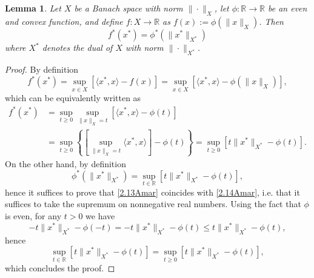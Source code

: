 \documentclass[a4paper,11pt,oneside,notitlepage]{article}
\newtheorem{lemma}[theorem]{Lemma}
\numberwithin{equation}{section}
\def\R{\mathbb{R}}
\begin{document}
\begin{lemma}
\label{lemmaApp}
    Let $X$ be a Banach space with norm $\|\cdot \|_X$, let $\phi : \R \to \R$ be an even and convex function, and define $f : X \to \R$ as $f(x) := \phi(\|x\|_X)$. Then
    \begin{equation*}
        f^*(x^*) = \phi^*(\|x^*\|_{X^*})
    \end{equation*}
    where $X^*$ denotes the dual of $X$ with norm $\|\cdot\|_{X^*}$.
\end{lemma}
\begin{proof}
    By definition
    \begin{equation*}
        f^*(x^*) = \sup_{x \in X} [\langle x^*, x \rangle - f(x)] = \sup_{x \in X} [\langle x^*, x \rangle - \phi(\|x\|_{X})],
    \end{equation*}
    which can be equivalently written as
    \begin{equation}
    \begin{aligned}
    \label{2.13Amar}
        f^*(x^*)
        &= \sup_{t \ge 0} \sup_{\|x\|_X = t} [\langle x^*, x \rangle - \phi(t)] \\
        &= \sup_{t \ge 0} \left\{ \left[ \sup_{\|x\|_X = t} \langle x^*, x \rangle \right] - \phi(t) \right\} = \sup_{t \ge 0} [t \|x^*\|_{X^*} - \phi(t)].
    \end{aligned}
    \end{equation}
    On the other hand, by definition
    \begin{equation}
    \label{2.14Amar}
        \phi^*(\|x^*\|_{X^*}) = \sup_{t \in \R} [t \|x^*\|_{X^*} - \phi(t)],
    \end{equation}
    hence it suffices to prove that \eqref{2.13Amar} coincides with \eqref{2.14Amar}, i.e. that it suffices to take the supremum on nonnegative real numbers. Using the fact that $\phi$ is even, for any $t > 0$ we have
    \begin{equation*}
        -t \|x^*\|_{X^*} - \phi(-t) = -t \|x^*\|_{X^*} - \phi(t) \le t \|x^*\|_{X^*} - \phi(t),
    \end{equation*}
    hence
    \begin{equation*}
        \sup_{t \in \R} [t\|x^*\|_{X^*} - \phi(t)] = \sup_{t \ge 0} [t\|x^*\|_{X^*} - \phi(t)],
    \end{equation*}
    which concludes the proof.
\end{proof}



\end{document}

